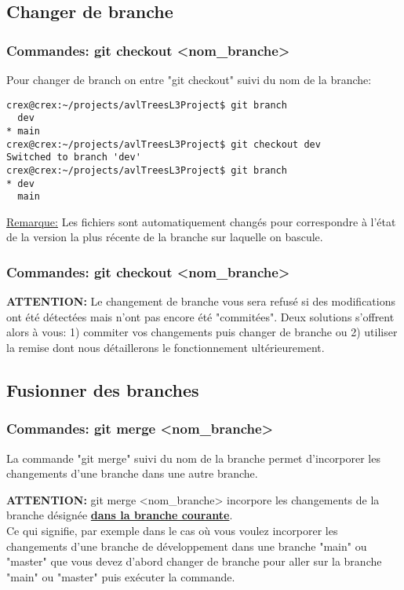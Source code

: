 \documentclass{beamer}
\begin{document}
\subsection{Changer de branche}
\begin{frame}[fragile]
\frametitle{Commandes: git checkout <nom\_branche>}

Pour changer de branch on entre "git checkout" suivi du nom de la branche:
\smallskip

\begin{mdframed}[style=Bash]
    \begin{lstlisting}[style=Bash, caption={Exemple de création et de suppression de branche}]
crex@crex:~/projects/avlTreesL3Project$ git branch
  dev
* main
crex@crex:~/projects/avlTreesL3Project$ git checkout dev
Switched to branch 'dev'
crex@crex:~/projects/avlTreesL3Project$ git branch
* dev
  main
    \end{lstlisting}
\end{mdframed}
\medskip

\underline{Remarque:} Les fichiers sont automatiquement changés pour correspondre à l'état de la version la plus récente de la branche sur laquelle on bascule.\\
\smallskip
\end{frame}

\begin{frame}
\frametitle{Commandes: git checkout <nom\_branche>}
\textbf{ATTENTION:} Le changement de branche vous sera refusé si des modifications ont été détectées mais n'ont pas encore été "commitées". Deux solutions s'offrent alors à vous: 1) commiter vos changements puis changer de branche ou 2) utiliser la remise dont nous détaillerons le fonctionnement ultérieurement.\\
\end{frame}

\subsection{Fusionner des branches}
\begin{frame}
\frametitle{Commandes: git merge <nom\_branche>}
La commande "git merge" suivi du nom de la branche permet d'incorporer les changements d'une branche dans une autre branche.\\
\medskip

\textbf{ATTENTION:} git merge <nom\_branche> incorpore les changements de la branche désignée \underline{\textbf{dans la branche courante}}.\\
\smallskip
Ce qui signifie, par exemple dans le cas où vous voulez incorporer les changements d'une branche de développement dans une branche "main" ou "master" que vous devez d'abord changer de branche pour aller sur la branche "main" ou "master" puis exécuter la commande.
\end{frame}
\end{document}

